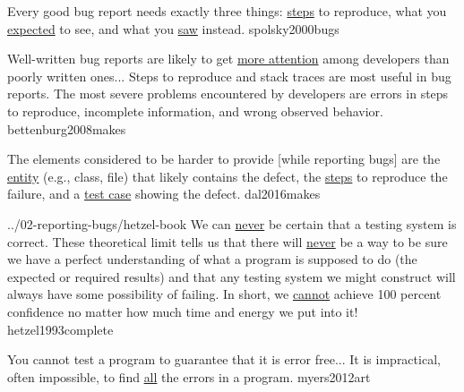 \documentclass{article}
\begin{document}

  {Every good bug report needs exactly three things: \ul{steps} to reproduce, what you \ul{expected} to see, and what you \ul{saw} instead.}
  {spolsky2000bugs}

  {Well-written bug reports are likely to get \ul{more attention} among developers than poorly written ones... Steps to reproduce and stack traces are most useful in bug reports. The most severe problems encountered by developers are errors in steps to reproduce, incomplete information, and wrong observed behavior.}
  {bettenburg2008makes}

  {The elements considered to be harder to provide [while reporting bugs] are the \ul{entity} (e.g., class, file) that likely contains the defect, the \ul{steps} to reproduce the failure, and a \ul{test case} showing the defect.}
  {dal2016makes}


\lnQuote
  {../02-reporting-bugs/hetzel-book}
  {We can \ul{never} be certain that a testing system is correct. These theoretical limit tells us that there will \ul{never} be a way to be sure we have a perfect understanding of what a program is supposed to do (the expected or required results) and that any testing system we might construct will always have some possibility of failing. In short, we \ul{cannot} achieve 100 percent confidence no matter how much time and energy we put into it!}
  {hetzel1993complete}

  {You cannot test a program to guarantee that it is error free... It is impractical, often impossible, to find \ul{all} the errors in a program.}
  {myers2012art}


\end{document}

